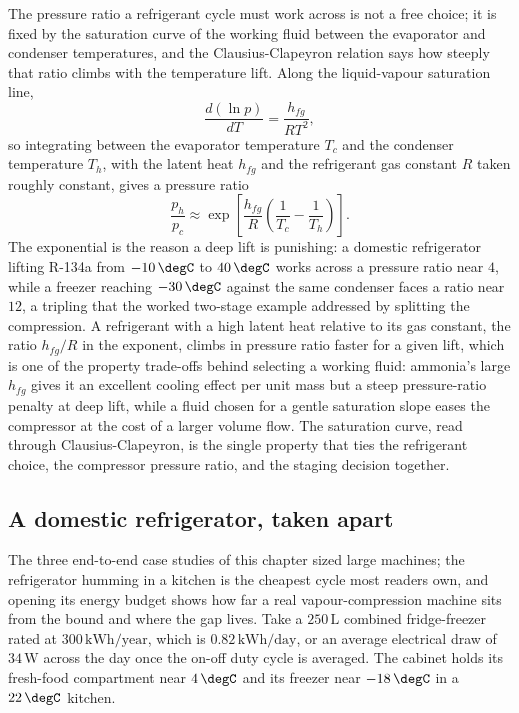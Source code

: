 \begin{mastery}
The pressure ratio a refrigerant cycle must work across is not a free choice;
it is fixed by the saturation curve of the working fluid between the evaporator
and condenser temperatures, and the Clausius-Clapeyron relation says how
steeply that ratio climbs with the temperature lift. Along the
liquid-vapour saturation line,
\[
\frac{d(\ln p)}{dT} = \frac{h_{fg}}{R T^2},
\]
so integrating between the evaporator temperature $T_c$ and the condenser
temperature $T_h$, with the latent heat $h_{fg}$ and the refrigerant gas
constant $R$ taken roughly constant, gives a pressure ratio
\[
\frac{p_h}{p_c} \approx \exp\!\left[\frac{h_{fg}}{R}
\left(\frac{1}{T_c} - \frac{1}{T_h}\right)\right].
\]
The exponential is the reason a deep lift is punishing: a domestic
refrigerator lifting R-134a from $-10\,\degC$ to $40\,\degC$ works across a
pressure ratio near $4$, while a freezer reaching $-30\,\degC$ against the same
condenser faces a ratio near $12$, a tripling that the worked two-stage example
addressed by splitting the compression. A refrigerant with a high latent heat
relative to its gas constant, the ratio $h_{fg}/R$ in the exponent, climbs in
pressure ratio faster for a given lift, which is one of the property trade-offs
behind selecting a working fluid: ammonia's large $h_{fg}$ gives it an
excellent cooling effect per unit mass but a steep pressure-ratio penalty at
deep lift, while a fluid chosen for a gentle saturation slope eases the
compressor at the cost of a larger volume flow. The saturation curve, read
through Clausius-Clapeyron, is the single property that ties the refrigerant
choice, the compressor pressure ratio, and the staging decision together.
\end{mastery}

\subsection{A domestic refrigerator, taken apart}

The three end-to-end case studies of this chapter sized large machines; the
refrigerator humming in a kitchen is the cheapest cycle most readers own, and
opening its energy budget shows how far a real vapour-compression machine sits
from the bound and where the gap lives. Take a $250\,\text{L}$ combined
fridge-freezer rated at $300\,\text{kWh}/\text{year}$, which is $0.82\,\text{
kWh}/\text{day}$, or an average electrical draw of $34\,\text{W}$ across the
day once the on-off duty cycle is averaged. The cabinet holds its fresh-food
compartment near $4\,\degC$ and its freezer near $-18\,\degC$ in a $22\,\degC$
kitchen.

